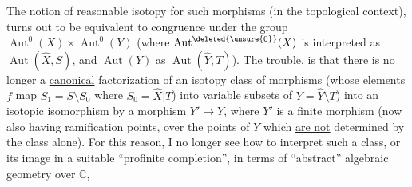 The notion of reasonable isotopy for
such morphisms (in the topological context),
turns out to be equivalent to congruence
under the group $\operatorname{Aut}^0(X)\times\operatorname{Aut}^0(Y)$
(where $\operatorname{Aut}^{\deleted{\unsure{0}}}(X)$ is interpreted as $\operatorname{Aut}(\widehat X,S)$,
and $\operatorname{Aut}(Y)$ as $\operatorname{Aut}(\widehat Y,T)$). The trouble,
is that there is no longer a
\uline{canonical} factorization of an isotopy class of
morphisms  (whose  elements $f$
map $S_1=S\setminus S_0$ where $S_0=\widehat X|T$) into
variable subsets of $Y=\widehat Y\setminus T$) into
an isotopic isomorphism   
 by a morphism $Y'\longrightarrow Y$, where $Y'$ is a
finite morphism (now also having
 ramification points, over the
points of $Y$ which \uline{are not} determined
by the class alone). For this reason,
I no longer see how to interpret such a
class, or its image in a suitable
 ``profinite completion'',
in terms of ``abstract'' algebraic geometry over $\mathbb C$,

